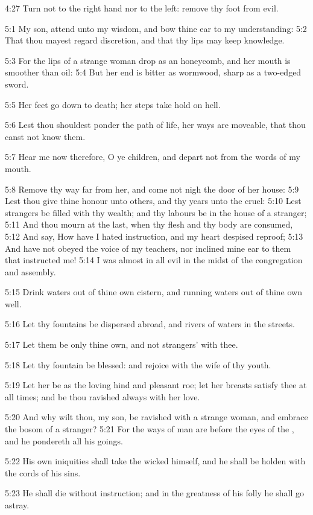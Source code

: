 4:27 Turn not to the right hand nor to the left: remove thy foot from evil.

5:1 My son, attend unto my wisdom, and bow thine ear to my understanding: 5:2 That thou mayest regard discretion, and that thy lips may keep knowledge.

5:3 For the lips of a strange woman drop as an honeycomb, and her mouth is smoother than oil: 5:4 But her end is bitter as wormwood, sharp as a two-edged sword.

5:5 Her feet go down to death; her steps take hold on hell.

5:6 Lest thou shouldest ponder the path of life, her ways are moveable, that thou canst not know them.

5:7 Hear me now therefore, O ye children, and depart not from the words of my mouth.

5:8 Remove thy way far from her, and come not nigh the door of her house: 5:9 Lest thou give thine honour unto others, and thy years unto the cruel: 5:10 Lest strangers be filled with thy wealth; and thy labours be in the house of a stranger; 5:11 And thou mourn at the last, when thy flesh and thy body are consumed, 5:12 And say, How have I hated instruction, and my heart despised reproof; 5:13 And have not obeyed the voice of my teachers, nor inclined mine ear to them that instructed me!  5:14 I was almost in all evil in the midst of the congregation and assembly.

5:15 Drink waters out of thine own cistern, and running waters out of thine own well.

5:16 Let thy fountains be dispersed abroad, and rivers of waters in the streets.

5:17 Let them be only thine own, and not strangers' with thee.

5:18 Let thy fountain be blessed: and rejoice with the wife of thy youth.

5:19 Let her be as the loving hind and pleasant roe; let her breasts satisfy thee at all times; and be thou ravished always with her love.

5:20 And why wilt thou, my son, be ravished with a strange woman, and embrace the bosom of a stranger?  5:21 For the ways of man are before the eyes of the \LORD, and he pondereth all his goings.

5:22 His own iniquities shall take the wicked himself, and he shall be holden with the cords of his sins.

5:23 He shall die without instruction; and in the greatness of his folly he shall go astray.

